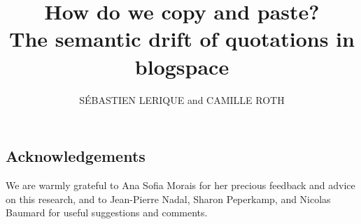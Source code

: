 \documentclass{acmtog}
\title{{How do we copy and paste?\\The semantic drift of quotations in blogspace}}
\date{}
\author{S\'EBASTIEN LERIQUE {\upshape and} CAMILLE ROTH}
\begin{document}
\maketitle







\subsection*{Acknowledgements}

We are warmly grateful to Ana Sofia Morais for her precious feedback and advice on this research, and to Jean-Pierre Nadal, Sharon Peperkamp, and Nicolas Baumard for useful suggestions and comments.




%
\end{document}
